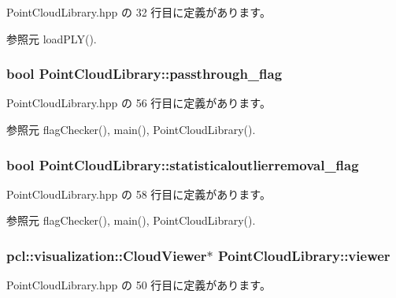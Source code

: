  Point\-Cloud\-Library.\-hpp の 32 行目に定義があります。



参照元 load\-P\-L\-Y().

\subsubsection[{passthrough\-\_\-flag}]{\setlength{\rightskip}{0pt plus 5cm}bool Point\-Cloud\-Library\-::passthrough\-\_\-flag}\label{class_point_cloud_library_a29aa3ebced9106bfc070d557efdbdbcf}


 Point\-Cloud\-Library.\-hpp の 56 行目に定義があります。



参照元 flag\-Checker(), main(), Point\-Cloud\-Library().

\subsubsection[{statisticaloutlierremoval\-\_\-flag}]{\setlength{\rightskip}{0pt plus 5cm}bool Point\-Cloud\-Library\-::statisticaloutlierremoval\-\_\-flag}\label{class_point_cloud_library_a25f7509ec80771a394266cc98c117a9b}


 Point\-Cloud\-Library.\-hpp の 58 行目に定義があります。



参照元 flag\-Checker(), main(), Point\-Cloud\-Library().

\subsubsection[{viewer}]{\setlength{\rightskip}{0pt plus 5cm}pcl\-::visualization\-::\-Cloud\-Viewer$\ast$ Point\-Cloud\-Library\-::viewer}\label{class_point_cloud_library_a43d9e8806ab9f7e52782604020922339}


 Point\-Cloud\-Library.\-hpp の 50 行目に定義があります。



